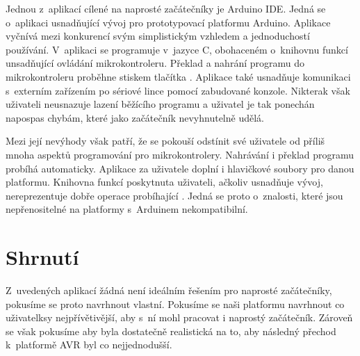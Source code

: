 Jednou z~aplikací cílené na naprosté začátečníky je Arduino IDE\cite{arduino-ide}. Jedná se o~aplikaci usnadňující vývoj pro prototypovací platformu Arduino. Aplikace vyčnívá mezi konkurencí svým simplistickým vzhledem a jednoduchostí používání. V~aplikaci se programuje v~jazyce C, obohaceném o~knihovnu funkcí unsadňující ovládání mikrokontroleru. Překlad a nahrání programu do mikrokontroleru proběhne stiskem tlačítka . Aplikace také usnadňuje komunikaci s~externím zařízením po sériové lince pomocí zabudované konzole. Nikterak však uživateli neusnazuje lazení běžícího programu a uživatel je tak ponechán napospas chybám, které jako začátečník nevyhnutelně udělá.

Mezi její nevýhody však patří, že se pokouší odstínit své uživatele od příliš mnoha aspektů programování pro mikrokontrolery. Nahrávání i překlad programu probíhá automaticky. Aplikace za uživatele doplní i hlavičkové soubory pro danou platformu. Knihovna funkcí poskytnuta uživateli, ačkoliv usnadňuje vývoj, nereprezentuje dobře operace probíhající . Jedná se proto o~znalosti, které jsou nepřenositelné na platformy s~Arduinem nekompatibilní.


\section{Shrnutí}

Z~uvedených aplikací žádná není ideálním řešením pro naprosté začátečníky, pokusíme se proto navrhnout vlastní. Pokusíme se naši platformu navrhnout co uživatelksy nejpřívětivější, aby s~ní mohl pracovat i naprostý začátečník. Zároveň se však pokusíme aby byla dostatečně realistická na to, aby následný přechod k~platformě AVR byl co nejjednodušší.